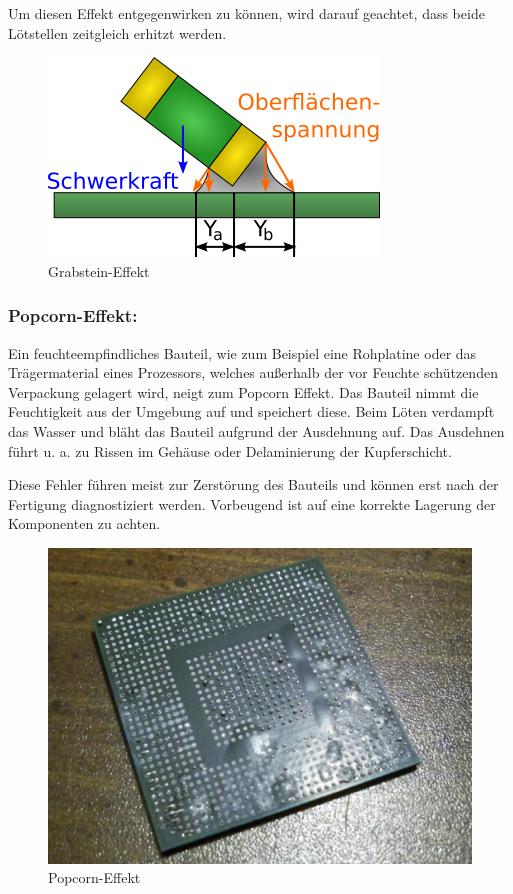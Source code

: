 Um diesen Effekt entgegenwirken zu können, wird darauf geachtet, dass beide Lötstellen zeitgleich erhitzt werden.
\begin{figure}[htbp!]
	\centering
	\includegraphics[width=.5\linewidth]{images/technische_grundlagen/grabsteinEffekt.png}%
	\caption{Grabstein-Effekt \cite{wikimedia-grabstein}}
\end{figure}

\subsubsection{Popcorn-Effekt:} %
Ein feuchteempfindliches Bauteil, wie zum Beispiel eine Rohplatine oder das Trägermaterial eines Prozessors, welches außerhalb der vor Feuchte schützenden Verpackung gelagert wird, neigt zum Popcorn Effekt.
Das Bauteil nimmt die Feuchtigkeit aus der Umgebung auf und speichert diese.
Beim Löten verdampft das Wasser und bläht das Bauteil aufgrund der Ausdehnung auf.
Das Ausdehnen führt u. a. zu Rissen im Gehäuse oder Delaminierung der Kupferschicht.\par

Diese Fehler führen meist zur Zerstörung des Bauteils und können erst nach der Fertigung diagnostiziert werden.
Vorbeugend ist auf eine korrekte Lagerung der Komponenten zu achten.
\begin{figure}[htbp!]
	\centering
	\includegraphics[width=.5\linewidth]{images/technische_grundlagen/popcornEffekt.jpg}%
	\caption{Popcorn-Effekt \cite{wikimedia-popcorn}}
\end{figure}

